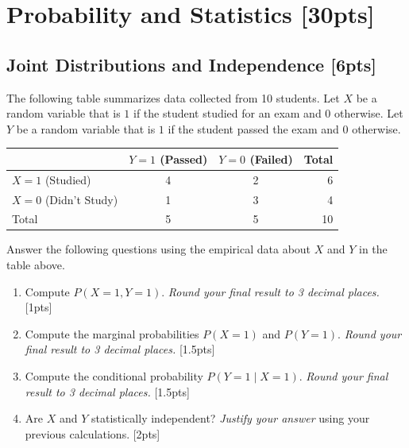 \section{Probability and Statistics [30pts]}



\subsection{Joint Distributions and Independence [6pts]}
The following table summarizes data collected from 10 students. Let $X$ be a random variable that is $1$ if the student studied for an exam and $0$ otherwise. Let $Y$ be a random variable that is $1$ if the student passed the exam and $0$ otherwise.

\begin{center}
\begin{tabular}{l|cc|r}
\hline\hline
 & $Y=1$ (Passed) & $Y=0$ (Failed) & Total \\
\hline
$X=1$ (Studied) & 4 & 2 & 6 \\
$X=0$ (Didn't Study) & 1 & 3 & 4 \\
\hline
Total & 5 & 5 & 10 \\
\hline\hline
\end{tabular}
\end{center}

Answer the following questions using the empirical data about $X$ and $Y$ in the table above.

\begin{enumerate}[label=\alph*.]
    \item Compute $P(X=1, Y=1)$. \emph{Round your final result to 3 decimal places.} [1pts] %

    \item Compute the marginal probabilities $P(X=1)$ and $P(Y=1)$. \emph{Round your final result to 3 decimal places.} [1.5pts] %

    \item Compute the conditional probability $P(Y=1 \mid X=1)$. \emph{Round your final result to 3 decimal places.} [1.5pts] %

    \item Are $X$ and $Y$ statistically independent? \emph{Justify your answer} using your previous calculations. [2pts]
\end{enumerate}
\newpage



